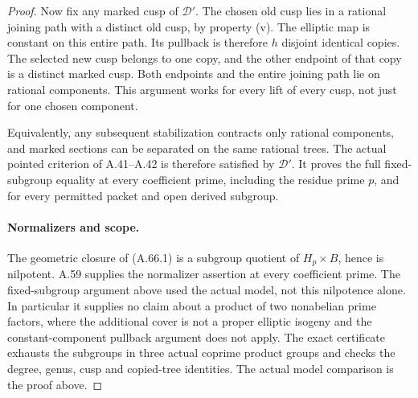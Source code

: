 \begin{proof}
Now fix any marked cusp of \(\mathcal D'\). The chosen
old cusp lies in a rational joining path with a distinct
old cusp, by property (v). The elliptic map is constant
on this entire path. Its pullback is therefore \(h\)
disjoint identical copies. The selected new cusp belongs
to one copy, and the other endpoint of that copy is a
distinct marked cusp. Both endpoints and the entire
joining path lie on rational components. This argument
works for every lift of every cusp, not just for one
chosen component.

Equivalently, any subsequent stabilization contracts only
rational components, and marked sections can be separated
on the same rational trees. The actual pointed criterion
of A.41--A.42 is therefore satisfied by \(\mathcal D'\).
It proves the full fixed-subgroup equality at every
coefficient prime, including the residue prime \(p\),
and for every permitted packet and open derived subgroup.

\paragraph{Normalizers and scope.}
The geometric closure of (A.66.1) is a subgroup quotient
of \(H_p\times B\), hence is nilpotent. A.59 supplies the
normalizer assertion at every coefficient prime. The
fixed-subgroup argument above used the actual model,
not this nilpotence alone. In particular it supplies no
claim about a product of two nonabelian prime factors,
where the additional cover is not a proper elliptic
isogeny and the constant-component pullback argument
does not apply.
The exact certificate
exhausts the subgroups in three actual coprime product groups
and checks the degree, genus, cusp and copied-tree identities.
The actual model comparison is the proof above.
\end{proof}
